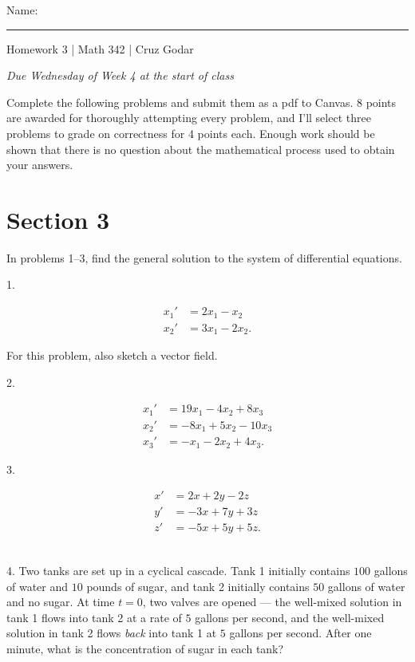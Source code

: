 \documentclass{article}
\begin{document}
\Large Name: \rule{2in}{0.15mm} \hfill Homework 3 | Math 342 | Cruz Godar \vspace{4pt}  \normalsize

\textit{Due Wednesday of Week 4 at the start of class}

Complete the following problems and submit them as a pdf to Canvas. 8 points are awarded for thoroughly attempting every problem, and I'll select three problems to grade on correctness for 4 points each. Enough work should be shown that there is no question about the mathematical process used to obtain your answers.

\section{Section 3}

In problems 1--3, find the general solution to the system of differential equations.

1.

\begin{align*}
	x_1' &= 2x_1 - x_2\\
	x_2' &= 3x_1 - 2x_2.
\end{align*}

For this problem, also sketch a vector field.

2.

\begin{align*}
	x_1' &= 19x_1 - 4x_2 + 8x_3\\
	x_2' &= -8x_1 + 5x_2 - 10x_3\\
	x_3' &= -x_1 - 2x_2 + 4x_3.
\end{align*}

3.

\begin{align*}
	x' &= 2x + 2y - 2z\\
	y' &= -3x + 7y + 3z\\
	z' &= -5x + 5y + 5z.
\end{align*}

~\\

4. Two tanks are set up in a cyclical cascade. Tank 1 initially contains $100$ gallons of water and $10$ pounds of sugar, and tank 2 initially contains $50$ gallons of water and no sugar. At time $t = 0$, two valves are opened --- the well-mixed solution in tank 1 flows into tank 2 at a rate of $5$ gallons per second, and the well-mixed solution in tank 2 flows \textit{back} into tank 1 at $5$ gallons per second. After one minute, what is the concentration of sugar in each tank?
\end{document}
